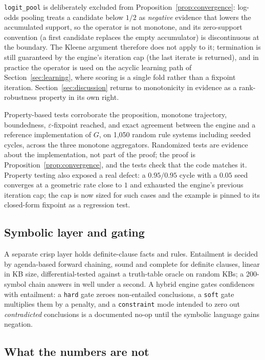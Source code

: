 \texttt{logit\_pool} is deliberately excluded from
Proposition~\ref{prop:convergence}: log-odds pooling treats a candidate
below $1/2$ as \emph{negative} evidence that lowers the accumulated
support, so the operator is not monotone, and its zero-support
convention (a first candidate replaces the empty accumulator) is
discontinuous at the boundary. The Kleene argument therefore does not
apply to it; termination is still guaranteed by the engine's iteration
cap (the last iterate is returned), and in practice the operator is
used on the acyclic learning path of Section~\ref{sec:learning}, where
scoring is a single fold rather than a fixpoint iteration.
Section~\ref{sec:discussion} returns to monotonicity in evidence as a
rank-robustness property in its own right.

Property-based tests corroborate the proposition, monotone
trajectory, boundedness, $\varepsilon$-fixpoint reached, and exact
agreement between the engine and a reference implementation of $G$,
on 1{,}050 random rule systems including seeded cycles, across the
three monotone aggregators. Randomized tests are evidence about the
implementation, not part of the proof; the proof is
Proposition~\ref{prop:convergence}, and the tests check that the code
matches it. Property testing also exposed a real defect: a
$0.95/0.95$ cycle with a $0.05$ seed converges at a geometric rate close
to $1$ and exhausted the engine's previous iteration cap; the cap is now
sized for such cases and the example is pinned to its closed-form
fixpoint as a regression test.

\subsection{Symbolic layer and gating}

A separate crisp layer holds definite-clause facts and rules. Entailment
is decided by agenda-based forward chaining, sound and complete for
definite clauses, linear in KB size, differential-tested against a
truth-table oracle on random KBs; a 200-symbol chain answers in well
under a second. A hybrid engine gates confidences with entailment: a
\texttt{hard} gate zeroes non-entailed conclusions, a \texttt{soft} gate
multiplies them by a penalty, and a \texttt{constraint} mode intended to
zero out \emph{contradicted} conclusions is a documented no-op until the
symbolic language gains negation.

\subsection{What the numbers are not}\label{sec:notprob}

